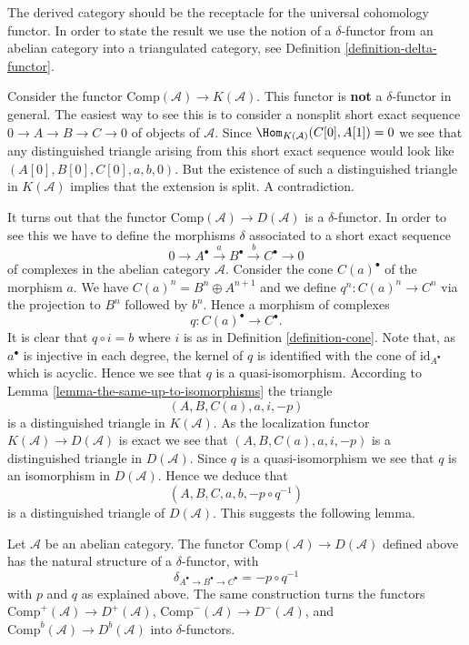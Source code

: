 \noindent
The derived category should be the receptacle for the universal
cohomology functor. In order to state the result we use
the notion of a $\delta$-functor from an abelian category
into a triangulated category, see
Definition \ref{definition-delta-functor}.

\medskip\noindent
Consider the functor
$\text{Comp}(\mathcal{A}) \to K(\mathcal{A})$.
This functor is {\bf not} a $\delta$-functor in general.
The easiest way to see this is to consider a nonsplit
short exact sequence $0 \to A \to B \to C \to 0$
of objects of $\mathcal{A}$. Since
$\Hom_{K(\mathcal{A})}(C[0], A[1]) = 0$
we see that any distinguished triangle arising from
this short exact sequence would look like
$(A[0], B[0], C[0], a, b, 0)$. But the existence of such a
distinguished triangle in $K(\mathcal{A})$ implies
that the extension is split. A contradiction.

\medskip\noindent
It turns out that the functor
$\text{Comp}(\mathcal{A}) \to D(\mathcal{A})$ is a
$\delta$-functor. In order to see this we have to define
the morphisms $\delta$ associated to a short exact sequence
$$
0 \to A^\bullet \xrightarrow{a} B^\bullet \xrightarrow{b} C^\bullet \to 0
$$
of complexes in the abelian category $\mathcal{A}$.
Consider the cone $C(a)^\bullet$ of the morphism $a$.
We have $C(a)^n = B^n \oplus A^{n + 1}$ and we define
$q^n : C(a)^n \to C^n$ via the projection to $B^n$ followed
by $b^n$. Hence a morphism of complexes
$$
q : C(a)^\bullet \longrightarrow C^\bullet.
$$
It is clear that $q \circ i = b$ where $i$ is as in
Definition \ref{definition-cone}.
Note that, as $a^\bullet$ is injective in each degree,
the kernel of $q$ is identified with the cone of
$\text{id}_{A^\bullet}$ which is acyclic. Hence we see that
$q$ is a quasi-isomorphism. According to
Lemma \ref{lemma-the-same-up-to-isomorphisms}
the triangle
$$
(A, B, C(a), a, i, -p)
$$
is a distinguished triangle in $K(\mathcal{A})$.
As the localization functor
$K(\mathcal{A}) \to D(\mathcal{A})$ is
exact we see that $(A, B, C(a), a, i, -p)$ is a distinguished
triangle in $D(\mathcal{A})$. Since $q$ is a quasi-isomorphism
we see that $q$ is an isomorphism in $D(\mathcal{A})$.
Hence we deduce that
$$
(A, B, C, a, b, -p \circ q^{-1})
$$
is a distinguished triangle of $D(\mathcal{A})$.
This suggests the following lemma.

\begin{lemma}
\label{lemma-derived-canonical-delta-functor}
Let $\mathcal{A}$ be an abelian category. The functor
$\text{Comp}(\mathcal{A}) \to D(\mathcal{A})$
defined above has the natural structure of a $\delta$-functor,
with
$$
\delta_{A^\bullet \to B^\bullet \to C^\bullet} = - p \circ q^{-1}
$$
with $p$ and $q$ as explained above. The same construction turns the
functors
$\text{Comp}^{+}(\mathcal{A}) \to D^{+}(\mathcal{A})$,
$\text{Comp}^{-}(\mathcal{A}) \to D^{-}(\mathcal{A})$, and
$\text{Comp}^b(\mathcal{A}) \to D^b(\mathcal{A})$
into $\delta$-functors.
\end{lemma}


